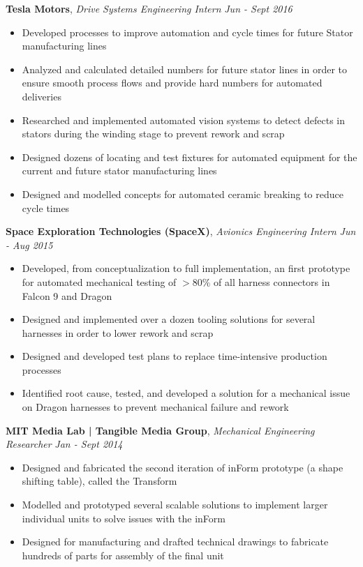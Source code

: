 \documentclass[9pt]{article}
\newenvironment{changemargin}[2]{%
  \begin{list}{}{%
    \setlength{\topsep}{0pt}%
    \setlength{\leftmargin}{#1}%
    \setlength{\rightmargin}{#2}%
    \setlength{\listparindent}{\parindent}%
    \setlength{\itemindent}{\parindent}%
    \setlength{\parsep}{\parskip}%
  }%
  \item[]}{\end{list}
}
\newcommand{\jobdescription}[1]{
	\begin{changemargin}{0.15in}{0.15in}
    \smallskip
		{#1}
    \medskip
	\end{changemargin}
}
\newcommand{\jobtitle}[3]{
	\textbf{#1}, \emph{#2} \hfill \emph{#3}\\
}
\newenvironment{body} {
	\vspace*{-16pt}
	\begin{changemargin}{-0.25in}{-0.5in}
  }	
	{\end{changemargin}
}
\begin{document}
\begin{body}
  \jobtitle{Tesla Motors}{Drive Systems Engineering Intern}{Jun - Sept 2016}
  \jobdescription{
  	\begin{itemize} \itemsep -0pt  %
  		\item Developed processes to improve automation and cycle times for future Stator manufacturing lines
  		\item Analyzed and calculated detailed numbers for future stator lines in order to ensure smooth process flows and provide hard numbers for automated deliveries
  		\item Researched and implemented automated vision systems to detect defects in stators during the winding stage to prevent rework and scrap
  		\item Designed dozens of locating and test fixtures for automated equipment for the current and future stator manufacturing lines
  		\item Designed and modelled concepts for automated ceramic breaking to reduce cycle times
  	\end{itemize}
  }

  \jobtitle{Space Exploration Technologies (SpaceX)}{Avionics Engineering Intern}{Jun - Aug 2015}
  \jobdescription{
  	\begin{itemize} \itemsep -0pt  %
  		\item Developed, from conceptualization to full implementation, an first prototype for automated mechanical testing of $>$80\% of all harness connectors in Falcon 9 and Dragon
  		\item Designed and implemented over a dozen tooling solutions for several harnesses in order to lower rework and scrap
  		\item Designed and developed test plans to replace time-intensive production processes
  		\item Identified root cause, tested, and developed a solution for a mechanical issue on Dragon harnesses to prevent mechanical failure and rework
  	\end{itemize}
  }

	\jobtitle{MIT Media Lab | Tangible Media Group} {Mechanical Engineering Researcher}{Jan - Sept 2014}
  \jobdescription{
  	\begin{itemize} \itemsep -0pt  %
  		\item Designed and fabricated the second iteration of inForm prototype (a shape shifting table), called the Transform
  		\item Modelled and prototyped several scalable solutions to implement larger individual units to solve issues with the inForm 
  		\item Designed for manufacturing and drafted technical drawings to fabricate hundreds of parts for assembly of the final unit   
  \end{itemize}
  }
  

\end{body}
\end{document}
